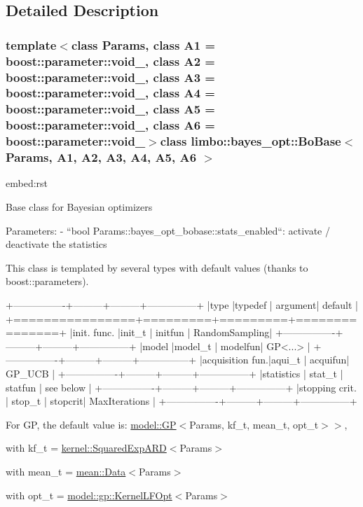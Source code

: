 \subsection{Detailed Description}
\subsubsection*{template$<$class Params, class A1 = boost\+::parameter\+::void\+\_\+, class A2 = boost\+::parameter\+::void\+\_\+, class A3 = boost\+::parameter\+::void\+\_\+, class A4 = boost\+::parameter\+::void\+\_\+, class A5 = boost\+::parameter\+::void\+\_\+, class A6 = boost\+::parameter\+::void\+\_\+$>$class limbo\+::bayes\+\_\+opt\+::\+Bo\+Base$<$ Params, A1, A2, A3, A4, A5, A6 $>$}

\begin{DoxyVerb}embed:rst

Base class for Bayesian optimizers

Parameters:
  - ``bool Params::bayes_opt_bobase::stats_enabled``: activate / deactivate the statistics

This class is templated by several types with default values (thanks to boost::parameters).

+----------------+---------+---------+---------------+
|type            |typedef  | argument| default       |
+================+=========+=========+===============+
|init. func.     |init_t   | initfun | RandomSampling|
+----------------+---------+---------+---------------+
|model           |model_t  | modelfun| GP<...>       |
+----------------+---------+---------+---------------+
|acquisition fun.|aqui_t   | acquifun| GP_UCB        |
+----------------+---------+---------+---------------+
|statistics      | stat_t  | statfun | see below     |
+----------------+---------+---------+---------------+
|stopping crit.  | stop_t  | stopcrit| MaxIterations |
+----------------+---------+---------+---------------+\end{DoxyVerb}


For G\+P, the default value is\+: {\ttfamily \hyperlink{classlimbo_1_1model_1_1_g_p}{model\+::\+G\+P}$<$Params, kf\+\_\+t, mean\+\_\+t, opt\+\_\+t$>$$>$},
\begin{DoxyItemize}
\item with {\ttfamily kf\+\_\+t = \hyperlink{structlimbo_1_1kernel_1_1_squared_exp_a_r_d}{kernel\+::\+Squared\+Exp\+A\+R\+D}$<$Params$>$}
\item with {\ttfamily mean\+\_\+t = \hyperlink{structlimbo_1_1mean_1_1_data}{mean\+::\+Data}$<$Params$>$}
\item with {\ttfamily opt\+\_\+t = \hyperlink{structlimbo_1_1model_1_1gp_1_1_kernel_l_f_opt}{model\+::gp\+::\+Kernel\+L\+F\+Opt}$<$Params$>$}
\end{DoxyItemize}


